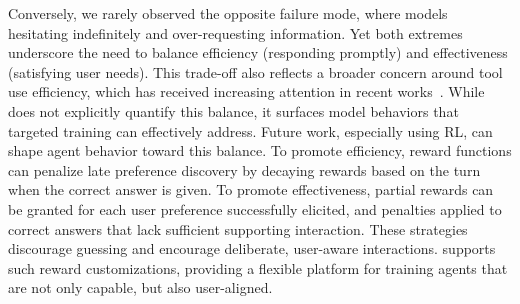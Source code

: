 Conversely, we rarely observed the opposite failure mode, where models hesitating indefinitely and over-requesting information. Yet both extremes underscore the need to balance efficiency (responding promptly) and effectiveness (satisfying user needs). This trade-off also reflects a broader concern around tool use efficiency, which has received increasing attention in recent works~\citep{qian2025smart, wang2025acting}. While {\gymname} does not explicitly quantify this balance, it surfaces model behaviors that targeted training can effectively address.
Future work, especially using RL, can shape agent behavior toward this balance. To promote efficiency, reward functions can penalize late preference discovery by decaying rewards based on the turn when the correct answer is given. To promote effectiveness, partial rewards can be granted for each user preference successfully elicited, and penalties applied to correct answers that lack sufficient supporting interaction. These strategies discourage guessing and encourage deliberate, user-aware interactions. {\gymname} supports such reward customizations, providing a flexible platform for training agents that are not only capable, but also user-aligned.
